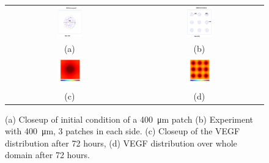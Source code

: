 \begin{figure}
 \begin{center}
  \begin{tabular}{cc}
   \includegraphics[width=0.20\textwidth]{./figures/400_one.png} &   \includegraphics[width=0.20\textwidth]{./figures/Patch400.png} \\
   (a) & (b) \\
   \includegraphics[width=0.20\textwidth]{./figures/O400VEGF solute 072.png} &  \includegraphics[width=0.20\textwidth]{./figures/C400VEGF solute 072.png} \\
   (c) & (d)
   \end{tabular}
   \end{center}

\caption{(a) Closeup of initial condition of a \SI{400}{\micro\metre} patch (b) Experiment with \SI{400}{\micro\metre}, 3 patches in each side. (c) Closeup of the VEGF distribution after 72 hours, (d) VEGF distribution over whole domain after 72 hours.  }
  \vspace{+1mm}
\label{simulation_examples}
\end{figure}

